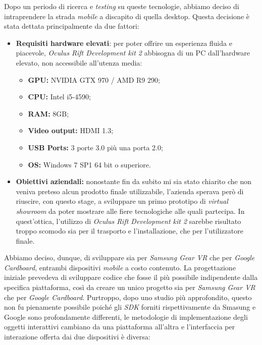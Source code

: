 Dopo un periodo di ricerca e \textit{testing} su queste tecnologie, abbiamo deciso di intraprendere la strada \textit{mobile} a discapito di quella desktop. Questa decisione è stata dettata principalmente da due fattori:

\begin{itemize}
	\item \textbf{Requisiti hardware elevati}: per poter offrire un esperienza fluida e piacevole, \textit{Oculus Rift Development kit 2} abbisogna di un PC dall'hardware elevato, non accessibile all'utenza media:
	\begin{itemize}
		\item \textbf{GPU:} NVIDIA GTX 970 / AMD R9 290;
		\item \textbf{CPU:} Intel i5-4590;
		\item \textbf{RAM:} 8GB;
		\item \textbf{Video output:} HDMI 1.3;
		\item \textbf{USB Ports:} 3 porte 3.0 più una porta 2.0;
		\item \textbf{OS:} Windows 7 SP1 64 bit o superiore.
	\end{itemize}
	
	\item \textbf{Obiettivi aziendali:} nonostante fin da subito mi sia stato chiarito che non veniva preteso alcun prodotto finale utilizzabile, l'azienda sperava però di riuscire, con questo stage, a sviluppare un primo prototipo di \textit{virtual showroom} da poter mostrare alle fiere tecnologiche alle quali partecipa. In quest'ottica, l'utilizzo di \textit{Oculus Rift Development kit 2} sarebbe risultato troppo scomodo sia per il trasporto e l'installazione, che per l'utilizzatore finale.
\end{itemize}

Abbiamo deciso, dunque, di sviluppare sia per \textit{Samsung Gear VR} che per \textit{Google Cardboard}, entrambi dispositivi \textit{mobile} a costo contenuto. La progettazione iniziale prevedeva di sviluppare codice che fosse il più possibile indipendente dalla specifica piattaforma, così da creare un unico progetto sia per \textit{Samsung Gear VR} che per \textit{Google Cardboard}. Purtroppo, dopo uno studio più approfondito, questo non fu pienamente possibile poiché gli \textit{SDK} forniti rispettivamente da Smasung e Google sono profondamente differenti, le metodologie di implementazione degli oggetti interattivi cambiano da una piattaforma all'altra e l'interfaccia per interazione offerta dai due dispositivi è diversa: 

